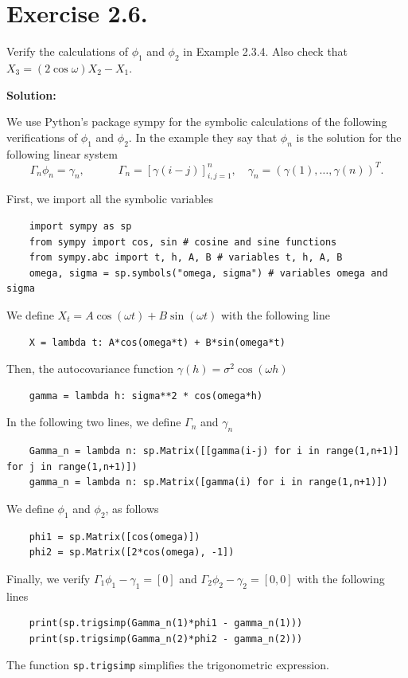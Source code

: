 \section*{Exercise 2.6.}

Verify the calculations of $\phi_1$ and $\phi_2$ in Example 2.3.4. Also check that $X_3 = (2\cos \omega)X_2 - X_1$.

\textbf{Solution:}

We use Python's package sympy for the symbolic calculations of the following verifications of $\phi_1$ and $\phi_2$. In the example they say that $\phi_n$ is the solution for the following linear system
\[ \Gamma_n \phi_n = \gamma_n,\hspace{3em} \Gamma_n = [\gamma(i-j)]_{i,j = 1}^{n},\hspace{1em} \gamma_n = (\gamma(1),\ldots, \gamma(n))^T. \]

First, we import all the symbolic variables
\begin{verbatim}
    import sympy as sp
    from sympy import cos, sin # cosine and sine functions
    from sympy.abc import t, h, A, B # variables t, h, A, B
    omega, sigma = sp.symbols("omega, sigma") # variables omega and sigma
\end{verbatim}

We define $X_t = A \cos (\omega t) + B \sin(\omega t)$ with the following line
\begin{verbatim}
    X = lambda t: A*cos(omega*t) + B*sin(omega*t)
\end{verbatim}
Then, the autocovariance function $\gamma(h) = \sigma^2 \cos(\omega h)$
\begin{verbatim}
    gamma = lambda h: sigma**2 * cos(omega*h)
\end{verbatim}
In the following two lines, we define $\Gamma_n$ and $\gamma_n$
\begin{verbatim}
    Gamma_n = lambda n: sp.Matrix([[gamma(i-j) for i in range(1,n+1)] for j in range(1,n+1)])
    gamma_n = lambda n: sp.Matrix([gamma(i) for i in range(1,n+1)])
\end{verbatim}
We define $\phi_1$ and $\phi_2$, as follows
\begin{verbatim}
    phi1 = sp.Matrix([cos(omega)])
    phi2 = sp.Matrix([2*cos(omega), -1])
\end{verbatim}

Finally, we verify $\Gamma_1 \phi_1 - \gamma_1 = [0]$ and $\Gamma_2 \phi_2 - \gamma_2 = [0,0]$ with the following lines
\begin{verbatim}
    print(sp.trigsimp(Gamma_n(1)*phi1 - gamma_n(1)))
    print(sp.trigsimp(Gamma_n(2)*phi2 - gamma_n(2)))
\end{verbatim}
The function \texttt{sp.trigsimp} simplifies the trigonometric expression.

